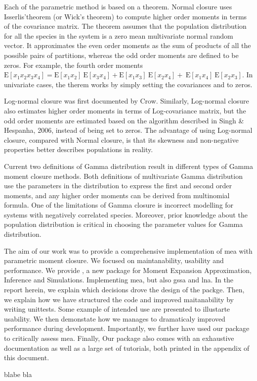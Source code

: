 Each of the parametric method is based on a theorem.
Normal closure uses Isserlis\rq theorem (or Wick\rq s theorem) to compute higher order moments in terms of the covariance matrix. 
The theorem assumes that the population distribution for all the species in the system is a zero mean multivariate normal random vector. 
It approximates the even order moments as the sum of products of all the possible pairs of partitions, whereas the odd order moments are defined to be zeros. 
For example, the fourth order moments $\mathrm{E}[x_1x_2x_3x_4] = \mathrm{E}[x_1x_2]\ \mathrm{E}[x_3x_4] + \mathrm{E}[x_1x_3]\ \mathrm{E}[x_2x_4]+\ \mathrm{E}[x_1x_4]\ \mathrm{E}[x_2x_3]$. 
In univariate cases, the therem works by simply setting the covariances and to zeros. 

Log-normal closure was first documented by Crow.  
Similarly, Log-normal closure also estimates higher order moments in terms of Log-covariance matrix, but the odd order moments are estimated based on the algorithm described in  Singh \& Hespanha, 2006, instead of being set to zeros.  The advantage of using Log-normal closure, compared with Normal closure, is that its skewness and non-negative properties better describes populations in reality.

Current two definitions of Gamma distribution result in different types of Gamma moment closure methods. Both definitions of multivariate Gamma distribution use the parameters in the distribution to express the first and second order moments, and any higher order moments can be derived from multinomial formula.  One of the limitations of Gamma closure is incorrect modelling for systems with negatively correlated species. 
Moreover, prior knowledge about the population distribution is critical in choosing the parameter values for Gamma distribution.  


The aim of our work was to provide a comprehensive implementation of \gls{mea} with parametric moment closure. 
We focused on maintanability, usability and performance. 
We provide \means, a new \py{} package for Moment Expansion Approximation, Inference and Simulations.
Implementing \gls{mea}, but also \gls{gssa} and \gls{lna}. 
In the report herein, we explain which decisions drove the design of the packge. 
Then, we explain how we have structured the code and improved maitanability by writing unittests.
Some example of intended use are presented to illustarte usability.
We then demonstate how we manages to dramaticaly improved performance during development.
Importantly, we further have used our package to critically assess \gls{mea}.
Finally, Our package also comes with an exhaustive documentation as well as a large set of tutorials, both printed in the appendix of this document.


blabe bla \cite{ale_general_2013}

